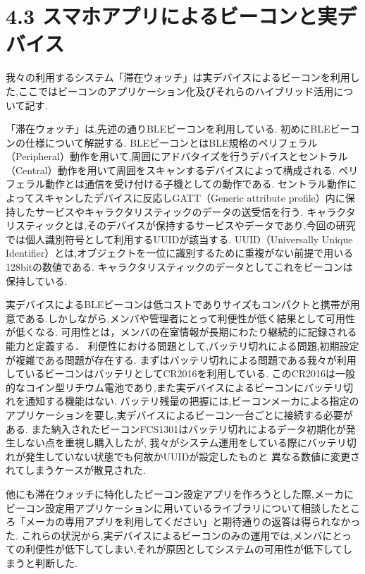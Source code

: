 \section*{4.3 スマホアプリによるビーコンと実デバイス}
我々の利用するシステム「滞在ウォッチ」は実デバイスによるビーコンを利用した,ここではビーコンのアプリケーション化及びそれらのハイブリッド活用について記す.

 「滞在ウォッチ」は,先述の通りBLEビーコンを利用している.
 初めにBLEビーコンの仕様について解説する.
 BLEビーコンとはBLE規格のペリフェラル（Peripheral）動作を用いて,周囲にアドバタイズを行うデバイスとセントラル（Central）動作を用いて周囲をスキャンするデバイスによって構成される.
 ペリフェラル動作とは通信を受け付ける子機としての動作である.
 セントラル動作によってスキャンしたデバイスに反応しGATT（Generic attribute profile）内に保持したサービスやキャラクタリスティックのデータの送受信を行う.
 キャラクタリスティックとは,そのデバイスが保持するサービスやデータであり,今回の研究では個人識別符号として利用するUUIDが該当する.
UUID（Universally Unique Identifier）とは,オブジェクトを一位に識別するために重複がない前提で用いる128bitの数値である.
キャラクタリスティックのデータとしてこれをビーコンは保持している.


 実デバイスによるBLEビーコンは低コストでありサイズもコンパクトと携帯が用意である.しかしながら,メンバや管理者にとって利便性が低く結果として可用性が低くなる.
 可用性とは，メンバの在室情報が長期にわたり継続的に記録される能力と定義する．
 利便性における問題として,バッテリ切れによる問題,初期設定が複雑である問題が存在する.
まずはバッテリ切れによる問題である我々が利用しているビーコンはバッテリとしてCR2016を利用している.
このCR2016は一般的なコイン型リチウム電池であり,また実デバイスによるビーコンにバッテリ切れを通知する機能はない.
バッテリ残量の把握には,ビーコンメーカによる指定のアプリケーションを要し,実デバイスによるビーコン一台ごとに接続する必要がある.
また納入されたビーコンFCS1301はバッテリ切れによるデータ初期化が発生しない点を重視し購入したが,
我々がシステム運用をしている際にバッテリ切れが発生していない状態でも何故かUUIDが設定したものと
異なる数値に変更されてしまうケースが散見された.

他にも滞在ウォッチに特化したビーコン設定アプリを作ろうとした際,メーカにビーコン設定用アプリケーションに用いているライブラリについて相談したところ「メーカの専用アプリを利用してください」と期待通りの返答は得られなかった.
これらの状況から,実デバイスによるビーコンのみの運用では,メンバにとっての利便性が低下してしまい,それが原因としてシステムの可用性が低下してしまうと判断した.




